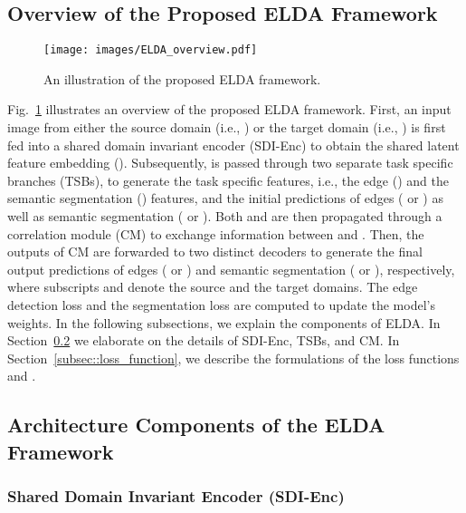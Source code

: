 \documentclass{bmvc2k}
\begin{document}
\subsection{Overview of the Proposed ELDA Framework}
\label{subsec::ELDA_framework_overview}

\begin{figure}[t]
  \centering
  \texttt{[image: images/ELDA\_overview.pdf]}
\caption{An illustration of the proposed ELDA framework. 
}
\label{fig:ELDA_framework_overview}
\end{figure}


Fig.~\ref{fig:ELDA_framework_overview} illustrates an overview of the proposed ELDA framework. First, an input image from either the source domain (i.e., ) or the target domain (i.e., ) is first fed into a shared domain invariant encoder (SDI-Enc) to obtain the shared latent feature embedding (). Subsequently,  is passed through two separate task specific branches (TSBs), to generate the task specific features, i.e., the edge () and the semantic segmentation () features, and the initial predictions of edges ( or ) as well as semantic segmentation ( or ).
Both  and  are then propagated through a correlation module (CM) to exchange information between  and . Then, the outputs of CM are forwarded to two distinct decoders to generate the final output predictions of edges ( or ) and semantic segmentation ( or ), respectively, where subscripts  and  denote the source and the target domains. The edge detection loss  and the segmentation loss  are computed to update the model's weights. In the following subsections, we explain the components of ELDA. In Section~\ref{subsec::ELDA_architecture} we elaborate on the details of SDI-Enc, TSBs, and CM. 
In Section~\ref{subsec::loss_function}, we describe the formulations of the loss functions  and .









\subsection{Architecture Components of the ELDA Framework}
\label{subsec::ELDA_architecture}




\subsubsection{Shared Domain Invariant Encoder (SDI-Enc)}
\label{subsubsec::SDI-Enc}
\end{document}

